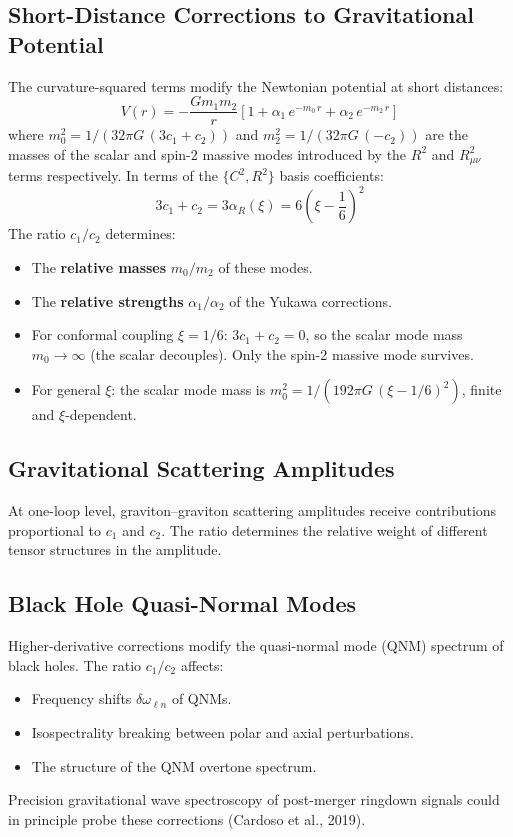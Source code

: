 \documentclass[11pt,a4paper]{article}
\begin{document}
\subsection{Short-Distance Corrections to Gravitational Potential}

The curvature-squared terms modify the Newtonian potential at short distances:
\begin{equation}
  V(r) = -\frac{G m_1 m_2}{r}\left[
    1
    + \alpha_1\,e^{-m_0\,r}
    + \alpha_2\,e^{-m_2\,r}
  \right]
\end{equation}
where $m_0^2 = 1/(32\pi G\,(3c_1 + c_2))$ and $m_2^2 = 1/(32\pi G\,(-c_2))$ are the masses of the scalar and spin-2 massive modes introduced by the $R^2$ and $R_{\mu\nu}^2$ terms respectively. In terms of the $\{C^2, R^2\}$ basis coefficients:
\begin{equation}
  3c_1 + c_2 = 3\alpha_R(\xi) = 6\!\left(\xi - \frac{1}{6}\right)^{\!2}
\end{equation}
The ratio $c_1/c_2$ determines:
\begin{itemize}
  \item The \textbf{relative masses} $m_0/m_2$ of these modes.
  \item The \textbf{relative strengths} $\alpha_1/\alpha_2$ of the Yukawa corrections.
  \item For conformal coupling $\xi = 1/6$: $3c_1 + c_2 = 0$, so the scalar mode mass $m_0 \to \infty$ (the scalar decouples). Only the spin-2 massive mode survives.
  \item For general $\xi$: the scalar mode mass is $m_0^2 = 1/(192\pi G\,(\xi - 1/6)^2)$, finite and $\xi$-dependent.
\end{itemize}

\subsection{Gravitational Scattering Amplitudes}

At one-loop level, graviton--graviton scattering amplitudes receive contributions proportional to $c_1$ and $c_2$. The ratio determines the relative weight of different tensor structures in the amplitude.

\subsection{Black Hole Quasi-Normal Modes}

Higher-derivative corrections modify the quasi-normal mode (QNM) spectrum of black holes. The ratio $c_1/c_2$ affects:
\begin{itemize}
  \item Frequency shifts $\delta\omega_{\ell n}$ of QNMs.
  \item Isospectrality breaking between polar and axial perturbations.
  \item The structure of the QNM overtone spectrum.
\end{itemize}
Precision gravitational wave spectroscopy of post-merger ringdown signals could in principle probe these corrections (Cardoso et al., 2019).
\end{document}
